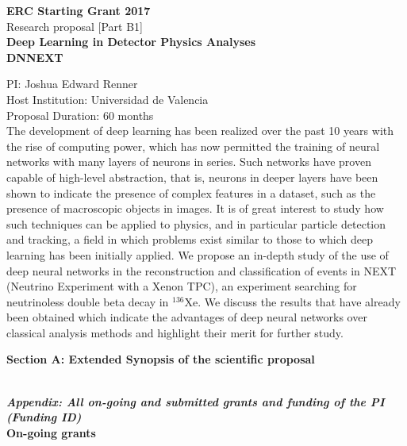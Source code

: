 \documentclass[11pt,a4paper]{article}
\begin{document}


\begin{center}
\large
\textbf{ERC Starting Grant 2017}\\
Research proposal [Part B1]\\[2.0\baselineskip]
\Large
\textbf{Deep Learning in Detector Physics Analyses}\\[1.0\baselineskip]
\LARGE
\textbf{DNNEXT}\\[1.0\baselineskip]
\end{center}

\noindent PI: Joshua Edward Renner\\
\noindent Host Institution: Universidad de Valencia\\
\noindent Proposal Duration: 60 months\\

The development of deep learning has been realized over the past 10 years with the rise of computing power, which has now permitted the training of neural networks with many layers
of neurons in series.  Such networks have proven capable of high-level abstraction, that is, neurons in deeper layers have been shown to indicate the presence of complex features in a dataset, 
such as the presence of macroscopic objects in images.  It is of great interest to study how such techniques can be applied to physics, and in particular particle detection and tracking, a field 
in which problems exist similar to those to which deep learning has been initially applied.  We propose an in-depth study of the use of deep neural networks in the reconstruction and classification of events in NEXT (Neutrino Experiment with a Xenon TPC), an experiment searching for neutrinoless double beta decay in $^{136}$Xe. We discuss the results that have already been obtained which indicate the advantages of deep neural networks over classical analysis methods and highlight their merit for further study.
\newpage
\normalsize

\newpage
{\textbf{Section A: Extended Synopsis of the scientific proposal}}

\newpage
{}\\[1.0\baselineskip]


\newpage
{\textbf{\emph{Appendix: All on-going and submitted grants and funding of the PI (Funding ID)}}}\\

\noindent\textbf{On-going grants}\\
\end{document}
